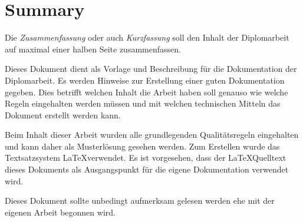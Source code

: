 

\chapter*{Summary}



Die \emph{Zusammenfassung} oder auch \emph{Kurzfassung} soll den Inhalt der Diplomarbeit auf maximal einer halben Seite zusammenfassen.

Dieses Dokument dient als Vorlage und Beschreibung für die Dokumentation der Diplomarbeit.
Es werden Hinweise zur Erstellung einer guten Dokumentation gegeben.
Dies betrifft welchen Inhalt die Arbeit haben soll genauso wie welche Regeln eingehalten werden müssen und mit welchen technischen Mitteln das Dokument erstellt werden kann.

Beim Inhalt dieser Arbeit wurden alle grundlegenden Qualitätsregeln eingehalten und kann daher als Musterlösung gesehen werden.
Zum Erstellen wurde das Textsatzsystem \LaTeX verwendet.
Es ist vorgesehen, dass der \LaTeX Quelltext dieses Dokuments als Ausgangspunkt für die eigene Dokumentation verwendet wird.

\begin{framed}
Dieses Dokument sollte unbedingt aufmerksam gelesen werden ehe mit der eigenen Arbeit begonnen wird.
\end{framed}

